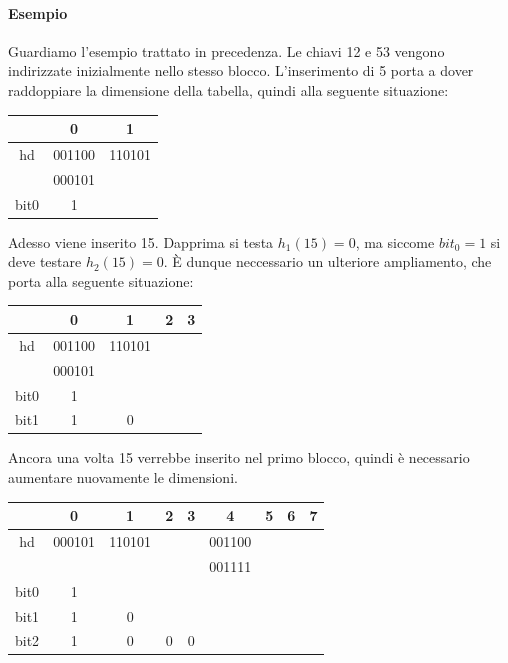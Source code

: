 \documentclass[a4paper]{book}
\begin{document}
\paragraph*{Esempio}
Guardiamo l'esempio trattato in precedenza. Le chiavi 12 e 53 vengono indirizzate inizialmente nello stesso blocco. L'inserimento di 5 porta a dover raddoppiare la dimensione della tabella, quindi alla seguente situazione:
\begin{center}
\begin{tabular}{|c|c|c|}
\hline 
  & 0 & 1 \\ 
\hline 
hd & 001100 & 110101 \\ 
\hline 
  & 000101 &   \\ 
\hline 
bit0 & 1 &   \\ 
\hline 
\end{tabular} 
\end{center}
Adesso viene inserito 15. Dapprima si testa $h_1(15)=0$, ma siccome $bit_0=1$ si deve testare $h_2(15)=0$. È dunque neccessario un ulteriore ampliamento, che porta alla seguente situazione:
\begin{center}
\begin{tabular}{|c|c|c|c|c|}
\hline 
  & 0 & 1 & 2 & 3 \\ 
\hline 
hd & 001100 & 110101 &   &   \\ 
\hline 
  & 000101 &   &   &   \\ 
\hline 
bit0 & 1 &   &   &   \\ 
\hline 
bit1 & 1 & 0 &   &   \\ 
\hline 
\end{tabular} 
\end{center}
Ancora una volta 15 verrebbe inserito nel primo blocco, quindi è necessario  aumentare nuovamente le dimensioni. 
\begin{center}
\begin{tabular}{|c|c|c|c|c|c|c|c|c|}
\hline 
  & 0 & 1 & 2 & 3 & 4 & 5 & 6 & 7 \\ 
\hline 
hd & 000101 & 110101 &   &   & 001100 &   &   &   \\ 
\hline 
  &   &   &   &   & 001111 &   &   &   \\ 
\hline 
bit0 & 1 &   &   &   &   &   &   &   \\ 
\hline 
bit1 & 1 & 0 &   &   &   &   &   &   \\ 
\hline 
bit2 & 1 & 0 & 0 & 0 &   &   &   &   \\ 
\hline 
\end{tabular} \end{center}
\end{document}
